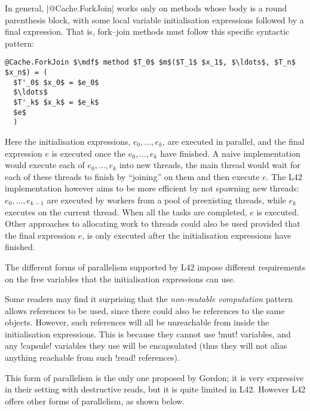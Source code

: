 In general, \Q|@Cache.ForkJoin| works only on methods whose body is a round parenthesis block, with some local variable initialisation expressions followed by a final expression.
That is, fork--join methods must follow this specific syntactic pattern:
\begin{lstlisting}[deletekeywords=label]
@Cache.ForkJoin $\mdf$ method $T_0$ $m$($T_1$ $x_1$, $\ldots$, $T_n$ $x_n$) = (
  $T'_0$ $x_0$ = $e_0$
  $\ldots$
  $T'_k$ $x_k$ = $e_k$
  $e$
  )
\end{lstlisting}
Here the initialisation expressions, $e_0,\ldots,e_k$, are executed in parallel, and the final expression $e$ is executed once the $e_0,\ldots,e_k$ have finished.
A naive implementation would execute each of $e_0,\ldots,e_k$  into new threads, the main thread would wait for each of these threads to finish by ``joining'' on them and then execute $e$.
The L42 implementation however aims to be more efficient by not spawning new threads: $e_0,\ldots,e_{k-1}$ are executed by workers from a pool of preexisting threads,
while $e_k$ executes on the current thread. When all the tasks are completed, $e$ is executed.
Other approaches to allocating work to threads could also be used provided that the final expression $e$, is only executed after the initialisation expressions have finished.

The different forms of parallelism supported by L42 impose different requirements on the free variables that the initialisation expressions can use.

Some readers may find it surprising that the \emph{non-mutable computation} pattern allows \Q@read@ references to be used, since there could also be \Q@mut@ references to the same objects.
However, such \Q@mut@ references will all be unreachable from inside the initialisation expressions. This is because they cannot use \Q!mut! variables, and any \Q!capsule! variables they use will be encapsulated (thus they will not alias anything reachable from such \Q!read! references).

This form of parallelism is the only one proposed by Gordon; it is very expressive in their setting with destructive reads, but it is quite limited in L42. However L42 offers other forms of parallelism, as shown below.



